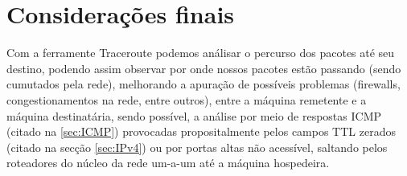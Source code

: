 \documentclass[
	article,			%
	11pt,				%
	oneside,			%
	a4paper,			%
	english,			%
	brazil,				%
	sumario=tradicional
	]{abntex2}
\begin{document}
\section{Considerações finais}
  Com a ferramente Traceroute podemos análisar o percurso dos pacotes até seu destino, podendo assim observar por onde nossos pacotes estão passando (sendo cumutados pela rede), melhorando a apuração de possíveis problemas (firewalls, congestionamentos na rede, entre outros), entre a máquina remetente e a máquina destinatária, sendo possível, a análise por meio de respostas ICMP (citado na  \ref{sec:ICMP}) provocadas propositalmente pelos campos TTL zerados (citado na secção \ref{sec:IPv4}) ou por portas altas não acessível, saltando pelos roteadores do núcleo da rede um-a-um até a máquina hospedeira.
  



\end{document}
